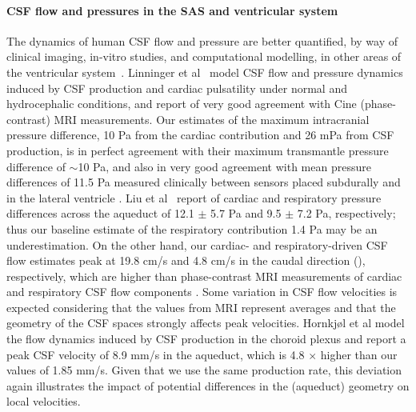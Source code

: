 \documentclass[fleqn,10pt]{wlscirep}
\begin{document}
\paragraph{CSF flow and pressures in the SAS and ventricular system}
The dynamics of human CSF flow and pressure are better quantified, by
way of clinical imaging, in-vitro studies, and computational
modelling, in other areas of the ventricular
system~\cite{linninger2007cerebrospinal, sweetman2011cerebrospinal,
  vinje2019respiratory, hornkjol2022csf, causemann2022human,
  karki2025real, liu2025transmantle}. Linninger et
al~\cite{linninger2007cerebrospinal} model CSF flow and pressure
dynamics induced by CSF production and cardiac pulsatility under
normal and hydrocephalic conditions, and report of very good agreement
with Cine (phase-contrast) MRI measurements. Our estimates of the
maximum intracranial pressure difference, 10 Pa from the cardiac
contribution and 26 mPa from CSF production, is in perfect agreement
with their maximum transmantle pressure difference of $\sim$10 Pa, and
also in very good agreement with mean pressure differences of 11.5 Pa
measured clinically between sensors placed subdurally and in the
lateral ventricle \cite{vinje2019respiratory}. Liu et
al~\cite{liu2025transmantle} report of cardiac and respiratory
pressure differences across the aqueduct of 12.1 $\pm$ 5.7 Pa and 9.5
$\pm$ 7.2 Pa, respectively; thus our baseline estimate of the respiratory contribution 1.4 Pa may be an
underestimation. On the other hand, our cardiac- and
respiratory-driven CSF flow estimates peak at 19.8 cm/s and 4.8 cm/s in the caudal direction (), respectively, which are higher than phase-contrast MRI measurements of cardiac and respiratory CSF flow
components \cite{takizawa2017characterization, yildiz2017quantifying}. Some variation in CSF flow velocities is expected considering that the values from MRI represent averages
\cite{yildiz2017quantifying} and that the geometry of the CSF spaces
strongly affects peak velocities\cite{vinje2019respiratory,
  causemann2022human}. Hornkjøl et al \cite{hornkjol2022csf} model the
flow dynamics induced by CSF production in the choroid plexus and
report a peak CSF velocity of 8.9 mm/s in the aqueduct, which is 4.8
$\times$ higher than our values of 1.85 mm/s. Given that we use the
same production rate, this deviation again illustrates the impact of
potential differences in the (aqueduct) geometry on local velocities.

\end{document}
